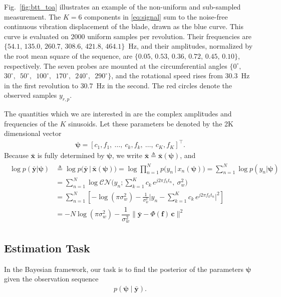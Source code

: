 \documentclass[journal,onecolumn]{IEEEtran}
\begin{document}
Fig.~\ref{fig:btt_toa} illustrates an example of the non-uniform and sub-sampled measurement. The $K=6$ components in \eqref{eq:signal} sum to the noise-free continuous vibration displacement of the blade, drawn as the blue curve. This curve is evaluated on $2000$ uniform samples per revolution. Their frequencies are $\{54.1,\,135.0,\,260.7,\,308.6,\,421.8,\,464.1\}$~Hz, and their amplitudes, normalized by the root mean square of the sequence, are $\{0.05,\,0.53,\,0.36,\,0.72,\,0.45,\,0.10\}$, respectively. The seven probes are mounted at the circumferential angles $\{0^\circ,$\allowbreak\ $30^\circ,$\allowbreak\ $50^\circ,$\allowbreak\ $100^\circ,$\allowbreak\ $170^\circ,$\allowbreak\ $240^\circ,$\allowbreak\ $290^\circ\}$, and the rotational speed rises from $30.3$~Hz in the first revolution to $30.7$~Hz in the second. The red circles denote the observed samples $y_{r,p}$.

The quantities which we are interested in are the complex amplitudes and frequencies of the $K$ sinusoids. Let these parameters be denoted by the 2K dimensional vector
\begin{eqnarray}
\label{eq:psi}
\pmb{\psi} = [c_1, f_1, \ \dots,\ c_k, f_k, \ \dots,\ c_K, f_K]^{\top}.
\end{eqnarray}
Because $\bar{\mathbf{x}}$ is fully determined by $\pmb{\psi}$, we write $\bar{\mathbf{x}} \triangleq \bar{\mathbf{x}}(\pmb{\psi})$, and
\begin{eqnarray}
\label{eq:Gaussian}
\begin{array}{rl}
     \log p(\bar{\mathbf{y}}|\pmb{\psi}) & \triangleq \log p\big(\bar{\mathbf{y}} \,\big|\, \bar{\mathbf{x}}(\pmb{\psi})\big)
       = \log \displaystyle\prod_{n=1}^{N} p\big(y_{n}\,\big|\, x_{n}( \pmb{\psi})\big)
       = \sum_{n=1}^{N} \log p(y_{n}| \pmb{\psi}) \\[10pt]
     & = \displaystyle\sum_{n=1}^{N} \log \mathcal{CN}\!\Big(y_n; \sum_{k=1}^K c_k \, e^{j 2\pi f_k t_n },\ \sigma_w^2\Big) \\[10pt]
     & = \displaystyle\sum_{n=1}^{N} \left[ -\log(\pi \sigma_w^{2})
       - \frac{1}{\sigma_w^{2}}\Big|y_n-\sum_{k=1}^K c_k \, e^{j 2\pi f_k t_n }\Big|^{2} \right] \\[10pt]
     & = -N\log(\pi\sigma_w^{2}) - \dfrac{1}{\sigma_w^{2}}\big\|\bar{\mathbf{y}}-\Phi(\mathbf{f})\,\mathbf{c}\big\|^{2}
\end{array}
\end{eqnarray}

\subsection{Estimation Task}
In the Bayesian framework, our task is to find the posterior of the parameters $\pmb{\psi}$ given the observation sequence
\begin{eqnarray}
\label{eq:task}
p(\pmb{\psi}\mid\bar{\mathbf{y}}).
\end{eqnarray}
\end{document}
